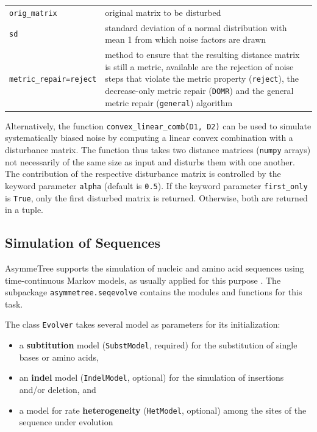 \documentclass[hidelinks,11pt]{article}
\newcommand{\sq}{\textquotesingle}
\begin{document}
\vspace{3mm}
{\small\centering
\begin{longtable}{ p{4.5cm} p{9cm} }
	\texttt{orig\_matrix} & original matrix to be disturbed\\
	\texttt{sd}  & standard deviation of a normal distribution with mean 1 from which noise factors are drawn\\
	\texttt{metric\_repair=\sq reject\sq}  & method to ensure that the resulting
	distance matrix is still a metric, available are the rejection of noise steps
	that violate the metric property (\texttt{\sq reject\sq}), the decrease-only
	metric repair (\texttt{\sq DOMR\sq}) and the general metric repair
	(\texttt{\sq general\sq}) algorithm\\
\end{longtable}
}
\vspace{3mm}

Alternatively, the function \texttt{convex\_linear\_comb(D1, D2)} can be used to simulate systematically biased noise by computing a linear convex combination with a disturbance matrix.
The function thus takes two distance matrices (\texttt{numpy} arrays) not necessarily of the same size as input and disturbs them with one another.
The contribution of the respective disturbance matrix is controlled by the keyword parameter \texttt{alpha} (default is \texttt{0.5}).
If the keyword parameter \texttt{first\_only} is \texttt{True}, only the first disturbed matrix is returned.
Otherwise, both are returned in a tuple.


\subsection{Simulation of Sequences}

AsymmeTree supports the simulation of nucleic and amino acid sequences using time-continuous Markov models, as usually applied for this purpose \citep[for textbooks, see e.g.][]{felsenstein2004,yang2006,yang2014}.
The subpackage \texttt{asymmetree.seqevolve} contains the modules and functions for this task.

The class \texttt{Evolver} takes several model as parameters for its initialization:
\begin{itemize}
	\item a \textbf{subtitution} model (\texttt{SubstModel}, required) for the substitution of single bases or amino acids,
	\item an \textbf{indel} model (\texttt{IndelModel}, optional) for the simulation of insertions and/or deletion, and
	\item a model for rate \textbf{heterogeneity} (\texttt{HetModel}, optional) among the sites of the sequence under evolution
\end{itemize}
\end{document}
